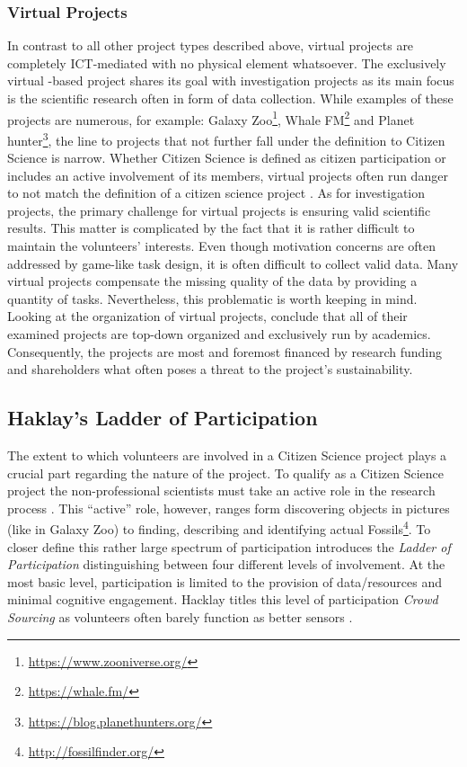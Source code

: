 \subsubsection{Virtual Projects}
In contrast to all other project types described above, virtual projects are completely ICT-mediated with no physical element whatsoever. The exclusively virtual -based project shares its goal with investigation projects as its main focus is the scientific research often in form of data collection. While examples of these projects are numerous, for example: Galaxy Zoo\footnote{\url{https://www.zooniverse.org/}}, Whale FM\footnote{\url{https://whale.fm/}} and Planet hunter\footnote{\url{https://blog.planethunters.org/}}, the line to projects that not further fall under the definition to Citizen Science is narrow. Whether Citizen Science is defined as citizen participation or includes an active involvement of its members, virtual projects often run danger to not match the definition of a citizen science project \parencite{Hakalay2014}. As for investigation projects, the primary challenge for virtual projects is ensuring valid scientific results. This matter is complicated by the fact that it is rather difficult to maintain the volunteers’ interests. Even though motivation concerns are often addressed by game-like task design, it is often difficult to collect valid data. Many virtual projects compensate the missing quality of the data by providing a quantity of tasks. Nevertheless, this problematic is worth keeping in mind. Looking at the organization of virtual projects, \citeauthor{WigginsCrowston2011} conclude that all of their examined projects are top-down organized and exclusively run by academics. Consequently, the projects are most and foremost financed by research funding and shareholders what often poses a threat to the project’s sustainability. \parencite{WigginsCrowston2011}

\subsection{Haklay’s Ladder of Participation}
\label{ssec:Ladder_Participation_CS}

The extent to which volunteers are involved in a Citizen Science project plays a crucial part regarding the nature of the project. To qualify as a Citizen Science project the non-professional scientists must take an active role in the research process \parencite{Eitzeletal2017}. This “active” role, however, ranges form discovering objects in pictures (like in Galaxy Zoo) to finding, describing and identifying actual Fossils\footnote{\url{http://fossilfinder.org/}}. To closer define this rather large spectrum of participation \citeauthor{Hakalay2014} introduces the \textit{Ladder of Participation} distinguishing between four different levels of involvement. At the most basic level, participation is limited to the provision of data/resources and minimal cognitive engagement. Hacklay titles this level of participation \textit{Crowd Sourcing} as volunteers often barely function as better sensors \parencite[xx]{Hakalay2014}.

